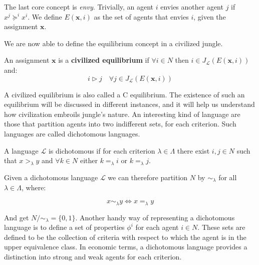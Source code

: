The last core concept is \textit{envy}. Trivially, an agent $i$ envies another agent $j$ if $x^j\succeq^ix^i$. We define $E(\textbf{x},i)$ as the set of agents that envies $i$, given the assignment $\textbf{x}$. 

We are now able to define the equilibrium concept in a civilized jungle.

\begin{definition}
    An assignment $\textbf{x}$ is a \textbf{civilized equilibrium} if $\forall i\in N$ then $i\in J_{\mathcal{L}}(E(\textbf{x},i))$ and:
    \[i\triangleright j \quad \forall j\in J_{\mathcal{L}}(E(\textbf{x},i)) \]
\end{definition}

A civilized equilibrium is also called a C equilibrium. The existence of such an equilibrium will be discussed in different instances, and it will help us understand how civilization embroils jungle's nature. An interesting kind of language are those that partition agents into two indifferent sets, for each criterion. Such languages are called dichotomous languages.

\begin{definition}\label{def: dichotomous language}
    A language $\mathcal{L}$ is dichotomous if for each criterion $\lambda\in\Lambda$ there exist $i,j\in N$ such that $x>_{\lambda}y$ and $\forall k\in N$ either $k=_{\lambda}i$ or $k=_{\lambda}j$.
\end{definition}

Given a dichotomous language $\mathcal{L}$ we can therefore partition $N$ by $\sim_{\lambda}$ for all $\lambda\in\Lambda$, where:

\[x\sim_{\lambda} y \Leftrightarrow x=_{\lambda}y\]

And get $N/\sim_{\lambda}=\{0,1\}$. Another handy way of representing a dichotomous language is to define a set of properties $\phi^i$ for each agent $i\in N$. These sets are defined to be the collection of criteria with respect to which the agent is in the upper equivalence class. In economic terms, a dichotomous language provides a distinction into strong and weak agents for each criterion. 


